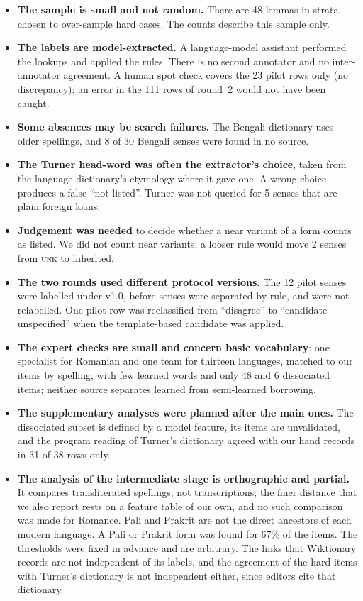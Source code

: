 \documentclass[11pt]{article}
\newcommand{\lbl}[1]{\textsc{#1}}
\begin{document}
\begin{itemize}
\item \textbf{The sample is small and not random.} There are 48 lemmas in strata chosen to over-sample hard cases. The counts describe this sample only.
\item \textbf{The labels are model-extracted.} A language-model assistant performed the lookups and applied the rules. There is no second annotator and no inter-annotator agreement. A human spot check covers the 23 pilot rows only (no discrepancy); an error in the 111 rows of round~2 would not have been caught.
\item \textbf{Some absences may be search failures.} The Bengali dictionary uses older spellings, and 8 of 30 Bengali senses were found in no source.
\item \textbf{The Turner head-word was often the extractor's choice}, taken from the language dictionary's etymology where it gave one. A wrong choice produces a false ``not listed''. Turner was not queried for 5 senses that are plain foreign loans.
\item \textbf{Judgement was needed} to decide whether a near variant of a form counts as listed. We did not count near variants; a looser rule would move 2 senses from \lbl{unk} to inherited.
\item \textbf{The two rounds used different protocol versions.} The 12 pilot senses were labelled under v1.0, before senses were separated by rule, and were not relabelled. One pilot row was reclassified from ``disagree'' to ``candidate unspecified'' when the template-based candidate was applied.
\item \textbf{The expert checks are small and concern basic vocabulary}: one specialist for Romanian and one team for thirteen languages, matched to our items by spelling, with few learned words and only 48 and 6 dissociated items; neither source separates learned from semi-learned borrowing.
\item \textbf{The supplementary analyses were planned after the main ones.} The dissociated subset is defined by a model feature, its items are unvalidated, and the program reading of Turner's dictionary agreed with our hand records in 31 of 38 rows only.
\item \textbf{The analysis of the intermediate stage is orthographic and partial.} It compares transliterated spellings, not transcriptions; the finer distance that we also report rests on a feature table of our own, and no such comparison was made for Romance. Pali and Prakrit are not the direct ancestors of each modern language. A Pali or Prakrit form was found for 67\% of the items. The thresholds were fixed in advance and are arbitrary. The links that Wiktionary records are not independent of its labels, and the agreement of the hard items with Turner's dictionary is not independent either, since editors cite that dictionary.

\end{itemize}
\end{document}
